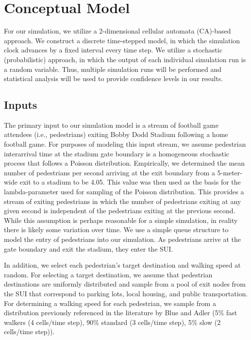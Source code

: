 \documentclass[12pt]{article}
\begin{document}
\section{Conceptual Model}
For our simulation, we utilize a 2-dimensional cellular automata (CA)-based
approach. We construct a discrete time-stepped model, in which the simulation
clock advances by a fixed interval every time step. We utilize a stochastic
(probabilistic) approach, in which the output of each individual simulation
run is a random variable. Thus, multiple simulation runs will be performed and
statistical analysis will be used to provide confidence levels in our results.

\subsection{Inputs}
The primary input to our simulation model is a stream of football game attendees
(i.e., pedestrians) exiting Bobby Dodd Stadium following a home football game.
For purposes of modeling this input stream, we assume pedestrian interarrival
time at the stadium gate boundary is a homogeneous stochastic process that
follows a Poisson distribution. Empirically, we determined the mean number of
pedestrians per second arriving at the exit boundary from a 5-meter-wide exit to
a stadium to be 4.05. This value was then used as the basis for the
lambda-parameter used for sampling of the Poisson distribution. This provides
a stream of exiting pedestrians in which the number of pedestrians exiting at
any given second is independent of the pedestrians exiting at the previous
second. While this assumption is perhaps reasonable for a simple simulation, in
reality there is likely some variation over time. We use a simple queue
structure to model the entry of pedestrians into our simulation. As pedestrians
arrive at the gate boundary and exit the stadium, they enter the SUI.

In addition, we select each pedestrian's target destination and walking
speed at random. For selecting a target destination, we assume that pedestrian
destinations are uniformly distributed and sample from a pool of exit nodes
from the SUI that correspond to parking lots, local housing, and public
transportation. For determining a walking speed for each pedestrian, we sample
from a distribution previously referenced in the literature by Blue and Adler
\cite{blue2001cellular} (5\% fast walkers (4 cells/time step), 90\% standard
(3 cells/time step), 5\% slow (2 cells/time step)).
\end{document}
